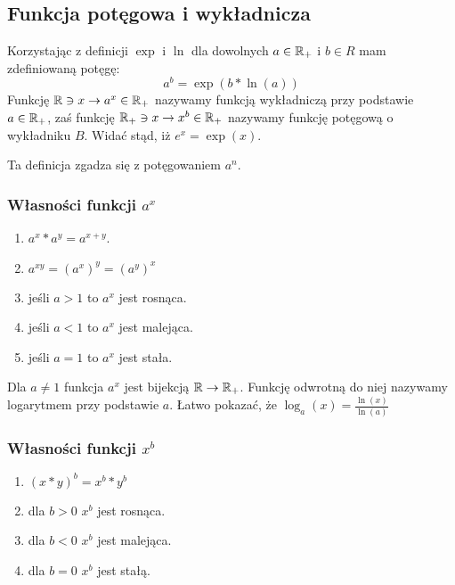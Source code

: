 \documentclass[9pt]{article}
\begin{document}
\subsection{Funkcja potęgowa i wykładnicza}

\begin{Def}
    Korzystając z definicji $\exp$ i $\ln$ dla dowolnych $a \in \mathbb{R}_+$ i $b \in R$ mam zdefiniowaną
    potęgę:
    \[
        a^b = \exp(b * \ln(a))
    \]
    Funkcję $\mathbb{R} \ni x \to a^x \in \mathbb{R}_+$ nazywamy funkcją wykładniczą przy podstawie $a \in \mathbb{R}_+$,
    zaś funkcję $\mathbb{R}_+ \ni x \to x^b \in \mathbb{R}_+$ nazywamy funkcję potęgową o wykładniku $B$. Widać
    stąd, iż $e^x = \exp(x)$.
\end{Def}

Ta definicja zgadza się z potęgowaniem $a^n$.

\subsubsection{Własności funkcji $a^x$}

\begin{enumerate}
    \item $a^x*a^y = a^{x+y}$.
    \item $a^{xy} = \left(a^x\right)^y = \left(a^y\right)^x$
    \item jeśli $a > 1$ to $a^x$ jest rosnąca.
    \item jeśli $a < 1$ to $a^x$ jest malejąca.
    \item jeśli $a = 1$ to $a^x$ jest stała.
\end{enumerate}

Dla $a \ne 1$ funkcja $a^x$ jest bijekcją $\mathbb{R} \to \mathbb{R}_+$. Funkcję odwrotną do niej nazywamy
logarytmem przy podstawie $a$. Łatwo pokazać, że $\log_a(x) = \frac{\ln(x)}{\ln(a)}$

\bigbreak

\subsubsection{Własności funkcji $x^b$}

\begin{enumerate}
    \item $(x*y)^b = x^b * y^b$
    \item dla $b > 0$ $x^b$ jest rosnąca.
    \item dla $b < 0$ $x^b$ jest malejąca.
    \item dla $b = 0$ $x^b$ jest stałą.
\end{enumerate}
\end{document}
